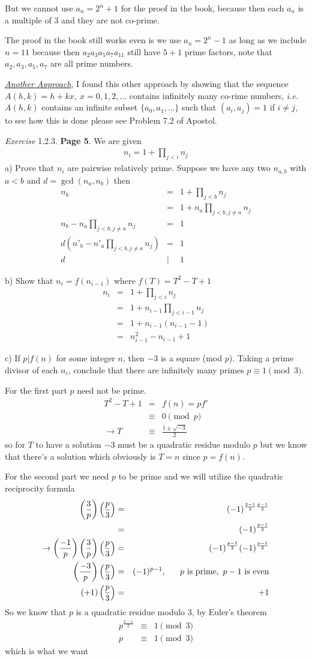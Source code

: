\documentclass[aps,preprint,preprintnumbers,nofootinbib,showpacs,prd]{revtex4-1}
\newcommand{\ie}{{\it i.e.} }
\newcommand{\nbea}{\begin{eqnarray*}}
\newcommand{\neea}{\end{eqnarray*}}
\begin{document}
But we cannot use $a_n = 2^n + 1$ for the proof in the book, because then each $a_n$ is a multiple of 3 and they are not co-prime.

The proof in the book still works even is we use $a_n = 2^n - 1$ as long as we include $n=11$ because then $a_2a_3a_5a_7a_{11}$ still have $5+1$ prime factors, note that $a_2,a_3,a_5,a_7$ are all prime numbers.

\underline{\it Another Approach}, I found this other approach by showing that the sequence $A(h,k) = h + kx, ~ x = 0,1,2,\dots$ contains infinitely many co-rime numbers, \ie $A(h,k)$ contains an infinite subset $\{a_0, a_1, \dots\}$ such that $(a_i, a_j) = 1$ if $i \neq j$, to see how this is done please see Problem 7.2 of Apostol.

{\it Exercise} 1.2.3. {\bf Page 5}. We are given
%
\nbea
n_i = 1 + \prod_{j<i} n_j
\neea
%
a) Prove that $n_i$ are pairwise relatively prime. Suppose we have any two $n_{a,b}$ with $a < b$ and $d = \gcd(n_a,n_b)$ then
%
\nbea
n_b & = & 1 + \prod_{j < b} n_j \\
& = & 1 + n_a \prod_{j < b, j\ne a} n_j \\
n_b - n_a \prod_{j < b, j\ne a} n_j & = & 1 \\
d\left(n'_b - n'_a \prod_{j < b, j\ne a} n_j\right) & = & 1 \\
d &|& 1
\neea
%

b) Show that $n_i = f(n_{i-1})$ where $f(T) = T^2 - T + 1$
%
\nbea
n_i & = & 1 + \prod_{j < i} n_j \\
& = & 1 + n_{i-1}\prod_{j < i-1} n_j \\
& = & 1 + n_{i-1}(n_{i-1} - 1) \\
& = & n^2_{i-1} - n_{i-1} + 1
\neea
%

c) If $p | f(n)$ for some integer $n$, then $-3$ is a square (mod $p$). Taking a prime divisor of each $n_i$, conclude that there are inﬁnitely many primes $p \equiv 1 \pmod{3}$.

For the first part $p$ need not be prime.
%
\nbea
T^2 - T + 1 & = & f(n) = p f'\\
& \equiv & 0 \pmod{p} \\
\to T & \equiv & \frac{1 \pm \sqrt{-3}}{2} 
\neea
%
so for $T$ to have a solution $-3$ must be a quadratic residue modulo $p$ but we know that there's a solution which obviously is $T=n$ since $p=f(n)$.

For the second part we need $p$ to be prime and we will utilize the quadratic reciprocity formula
%
\nbea
\left(\frac{3}{p}\right) \left(\frac{p}{3}\right) & = & (-1)^{\frac{3-1}{2}\frac{p-1}{2}} \\
& = & (-1)^{\frac{p-1}{2}} \\
\to \left(\frac{-1}{p}\right) \left(\frac{3}{p}\right) \left(\frac{p}{3}\right) & = &  (-1)^{\frac{p-1}{2}} (-1)^{\frac{p-1}{2}} \\
\left(\frac{-3}{p}\right) \left(\frac{p}{3}\right) & = & (-1)^{p-1}, ~~~~~ p {\rm~is~prime}, ~p-1~{\rm is~even} \\
(+1)\left(\frac{p}{3}\right) & = &  +1
\neea
%
So we know that $p$ is a quadratic residue modulo 3, by Euler's theorem
%
\nbea
p^{\frac{3-1}{2}} & \equiv & 1 \pmod{3} \\
p & \equiv & 1 \pmod{3}
\neea
% 
which is what we want
\end{document}
